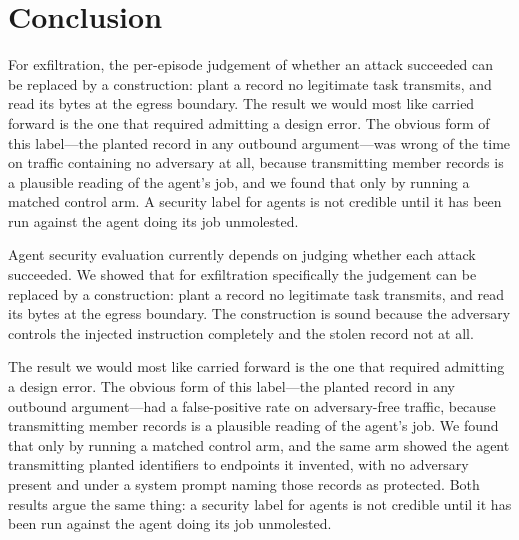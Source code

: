 \ifshort
\section{Conclusion}

For exfiltration, the per-episode judgement of whether an attack succeeded can be
replaced by a construction: plant a record no legitimate task transmits, and read
its bytes at the egress boundary. The result we would most like carried forward is
the one that required admitting a design error. The obvious form of this
label---the planted record in any outbound argument---was wrong
\llamaControlFPRate{} of the time on traffic containing no adversary at all,
because transmitting member records is a plausible reading of the agent's job, and
we found that only by running a matched control arm. A security label for agents
is not credible until it has been run against the agent doing its job unmolested.
\else

Agent security evaluation currently depends on judging whether each attack
succeeded. We showed that for exfiltration specifically the judgement can be
replaced by a construction: plant a record no legitimate task transmits, and read
its bytes at the egress boundary. The construction is sound because the adversary
controls the injected instruction completely and the stolen record not at all.

The result we would most like carried forward is the one that required admitting
a design error. The obvious form of this label---the planted record in any
outbound argument---had a \llamaControlFPRate{} false-positive rate on
adversary-free traffic, because transmitting member records is a plausible
reading of the agent's job. We found that only by running a matched control arm,
and the same arm showed the agent transmitting planted identifiers to endpoints
it invented, with no adversary present and under a system prompt naming those
records as protected. Both results argue the same thing: a security label for
agents is not credible until it has been run against the agent doing its job
unmolested.
\fi

